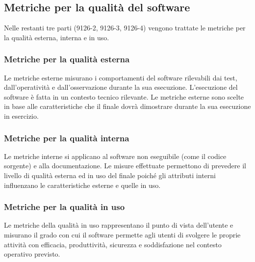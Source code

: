 \documentclass[PianoDiQualifica.tex]{subfiles}
\begin{document}
\subsection{Metriche per la qualità del software}
Nelle restanti tre parti (9126-2, 9126-3, 9126-4) vengono trattate le metriche per la qualità esterna, interna e in uso.

\subsubsection{Metriche per la qualità esterna}
Le metriche esterne misurano i comportamenti del software rilevabili dai test, dall’operatività e dall’osservazione durante la sua esecuzione.
L’esecuzione del software è fatta in un contesto tecnico rilevante.
Le metriche esterne sono scelte in base alle caratteristiche che il 
finale dovrà dimostrare durante la sua esecuzione in esercizio.

\subsubsection{Metriche per la qualità interna}
Le metriche interne si applicano al software non eseguibile (come il codice sorgente) e alla documentazione. Le misure effettuate permettono di prevedere il livello di qualità esterna ed in uso del  finale poiché gli attributi interni influenzano le caratteristiche esterne e quelle in uso.

\subsubsection{Metriche per la qualità in uso}
Le metriche della qualità in uso rappresentano il punto di vista dell'utente e misurano il grado con cui il software permette agli utenti di svolgere le proprie attività con efficacia, produttività, sicurezza e soddisfazione nel contesto operativo previsto.
\end{document}
